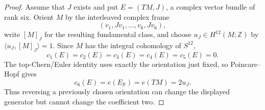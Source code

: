 \begin{proof}
Assume that \(J\) exists and put \(E=(TM,J)\), a complex vector bundle of
rank six.  Orient \(M\) by the interleaved complex frame
\[
 (v_1,Jv_1,\ldots,v_6,Jv_6),
\]
write \([M]_J\) for the resulting fundamental class, and choose
\(u_J\in H^{12}(M;\mathbb Z)\) by
\(\langle u_J,[M]_J\rangle=1\).  Since \(M\) has the integral cohomology of
\(S^{12}\),
\begin{equation}
 c_1(E)=c_2(E)=c_3(E)=c_4(E)=c_5(E)=0.
 \label{cusp-cone-S12-lower-Chern-zero}
\end{equation}
The top-Chern/Euler identity uses exactly the orientation just fixed, so
Poincare--Hopf gives
\begin{equation}
 c_6(E)=e(E_{\mathbb R})=e(TM)=2u_J.
 \label{cusp-cone-S12-top-Chern-two}
\end{equation}
Thus reversing a previously chosen orientation can change the displayed
generator but cannot change the coefficient two.


\end{proof}
